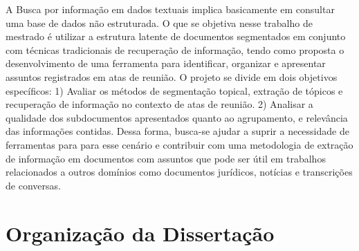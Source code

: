 A Busca por informação em dados textuais implica basicamente em consultar uma base de dados não estruturada. O que se objetiva nesse trabalho de mestrado é utilizar a estrutura latente de documentos segmentados em conjunto com técnicas tradicionais de recuperação de informação, tendo como 
proposta o desenvolvimento de uma ferramenta para identificar, organizar e apresentar assuntos registrados em atas de reunião. O projeto se divide em dois objetivos específicos: 1) Avaliar os métodos de segmentação topical, extração de tópicos e recuperação de informação no contexto de atas de reunião. 2) Analisar a qualidade dos subdocumentos apresentados quanto ao agrupamento, e relevância das informações contidas.
Dessa forma, busca-se ajudar a suprir a necessidade de ferramentas para para esse cenário e contribuir com uma metodologia de extração de informação em documentos com assuntos que pode ser útil em trabalhos relacionados a outros domínios como documentos jurídicos, notícias e transcrições de conversas.





\section{Organização da Dissertação}





